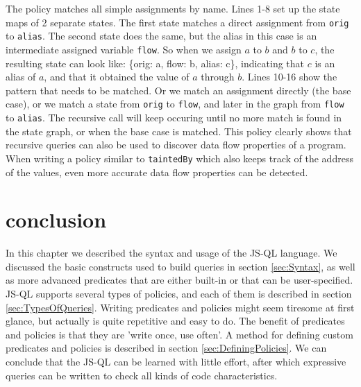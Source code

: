 The policy matches all simple assignments by name. Lines 1-8 set up the state maps of 2 separate states. The first state matches a direct assignment from \texttt{orig} to \texttt{alias}. The second state does the same, but the alias in this case is an intermediate assigned variable \texttt{flow}. So when we assign $a$ to $b$ and $b$ to $c$, the resulting state can look like: \{orig: a, flow: b, alias: c\}, indicating that $c$ is an alias of $a$, and that it obtained the value of $a$ through $b$. Lines 10-16 show the pattern that needs to be matched. Or we match an assignment directly (the base case), or we match a state from \texttt{orig} to \texttt{flow}, and later in the graph from \texttt{flow} to \texttt{alias}. The recursive call will keep occuring until no more match is found in the state graph, or when the base case is matched. This policy clearly shows that recursive queries can also be used to discover data flow properties of a program. When writing a policy similar to \texttt{taintedBy} which also keeps track of the address of the values, even more accurate data flow properties can be detected.

\section{conclusion}
In this chapter we described the syntax and usage of the JS-QL language. We discussed the basic constructs used to build queries in section \ref{sec:Syntax}, as well as more advanced predicates that are either built-in or that can be user-specified. JS-QL supports several types of policies, and each of them is described in section \ref{sec:TypesOfQueries}.
Writing predicates and policies might seem tiresome at first glance, but actually is quite repetitive and easy to do. The benefit of predicates and policies is that they are 'write once, use often'. A method for defining custom predicates and policies is described in section \ref{sec:DefiningPolicies}. We can conclude that the JS-QL can be learned with little effort, after which expressive queries can be written to check all kinds of code characteristics. 